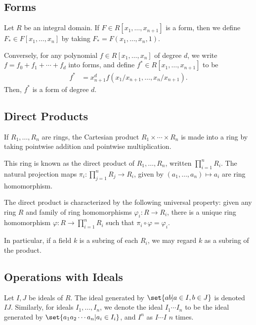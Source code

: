 \documentclass[10pt]{mypackage}
\begin{document}
\subsection{Forms}%
Let $R$ be an integral domain. If $F\in R\left[ x_1,\dots,x_{n+1} \right]$ is a form, then we define $F_{\ast}\in F\left[ x_1,\dots,x_n \right]$ by taking $F_{\ast} = F\left( x_1,\dots,x_n,1 \right)$.\newline

Conversely, for any polynomial $f\in R\left[ x_1,\dots,x_n \right]$ of degree $d$, we write $f = f_0 + f_1 + \cdots + f_d$ into forms, and define $f^{\ast}\in R\left[ x_1,\dots,x_{n+1} \right]$ to be
\begin{align*}
  f^{\ast} &= x^{d}_{n+1}f\left( x_1/x_{n+1},\dots,x_n/x_{n+1} \right).
\end{align*}
Then, $f^{\ast}$ is a form of degree $d$.
\subsection{Direct Products}%
If $R_1,\dots,R_n$ are rings, the Cartesian product $R_1\times\cdots\times R_n$ is made into a ring by taking pointwise addition and pointwise multiplication.\newline

This ring is known as the direct product of $R_1,\dots,R_n$, written $\prod_{i=1}^{n}R_i$. The natural projection maps $\pi_i\colon \prod_{j=1}^{n}R_j\rightarrow R_i$, given by $\left( a_1,\dots,a_n \right)\mapsto a_i$ are ring homomorphism.\newline

The direct product is characterized by the following universal property: given any ring $R$ and family of ring homomorphisms $\varphi_i\colon R\rightarrow R_i$, there is a unique ring homomorphism $\varphi\colon R\rightarrow \prod_{i=1}^{n}R_i$ such that $\pi_i\circ\varphi = \varphi_i$.\newline

In particular, if a field $k$ is a subring of each $R_i$, we may regard $k$ as a subring of the product.
\subsection{Operations with Ideals}%
Let $I,J$ be ideals of $R$. The ideal generated by $\set{ab | a\in I,b\in J}$ is denoted $IJ$. Similarly, for ideals $I_1,\dots,I_n$, we denote the ideal $I_1\cdots I_n $ to be the ideal generated by $ \set{a_1a_2\cdots a_n | a_i\in I_i}$, and $I^{n}$ as $I\cdots I$ $n$ times.\newline
\end{document}
